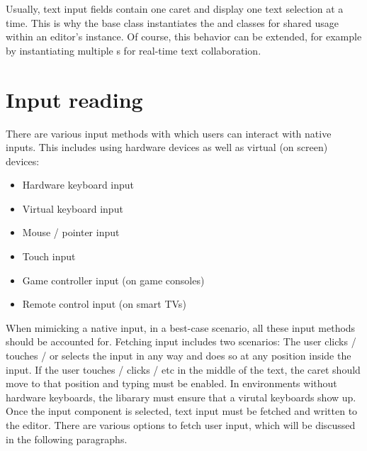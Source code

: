 
Usually, text input fields contain one caret and display one text selection at a time. This is why the  base class instantiates the  and  classes for shared usage within an editor's instance. Of course, this behavior can be extended, for example by instantiating multiple s for real-time text collaboration.






\section{Input reading}

There are various input methods with which users can interact with native inputs. This includes using hardware devices as well as virtual (on screen) devices:

\begin{itemize} 
\item Hardware keyboard input
\item Virtual keyboard input
\item Mouse / pointer input
\item Touch input
\item Game controller input (on game consoles)
\item Remote control input (on smart TVs)
\end{itemize}

When mimicking a native input, in a best-case scenario, all these input methods should be accounted for. Fetching input includes two scenarios: The user clicks / touches / or selects the input in any way and does so at any position inside the input. If the user touches / clicks / etc in the middle of the text, the caret should move to that position and typing must be enabled. In environments without hardware keyboards, the libarary must ensure that a virutal keyboards show up. Once the input component is selected, text input must be fetched and written to the editor. There are various options to fetch user input, which will be discussed in the following paragraphs.

